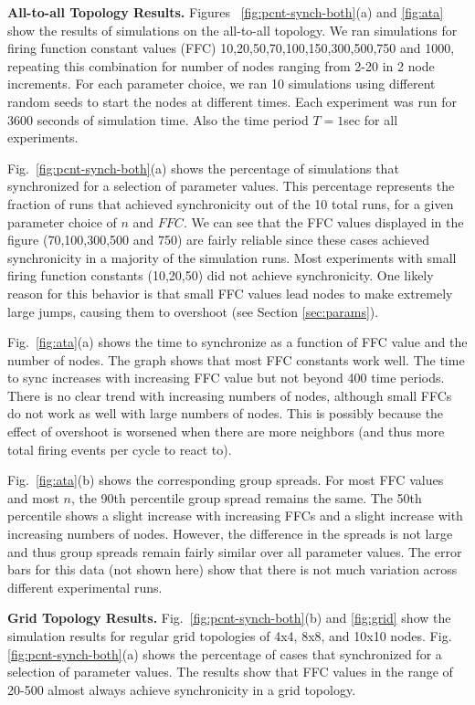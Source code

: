 {\bf All-to-all Topology Results.}  Figures
~\ref{fig:pcnt-synch-both}(a) and \ref{fig:ata} show the results of
simulations on the all-to-all topology. We ran simulations for firing
function constant values (FFC) 10,20,50,70,100,150,300,500,750 and
1000, repeating this combination for number of nodes ranging from 2-20
in 2 node increments. For each parameter choice, we ran 10 simulations
using different random seeds to start the nodes at different
times. Each experiment was run for 3600 seconds of simulation
time. Also the time period $T=1$sec for all experiments.

Fig.~\ref{fig:pcnt-synch-both}(a) shows the percentage of simulations
that synchronized for a selection of parameter values. This percentage
represents the fraction of runs that achieved synchronicity out of the
10 total runs, for a given parameter choice of $n$ and $FFC$.  We can
see that the FFC values displayed in the figure (70,100,300,500 and
750) are fairly reliable since these cases achieved synchronicity in a
majority of the simulation runs.  Most experiments with small firing
function constants (10,20,50) did not achieve synchronicity. One
likely reason for this behavior is that small FFC values lead nodes to
make extremely large jumps, causing them to overshoot (see Section
\ref{sec:params}).

Fig.~\ref{fig:ata}(a) shows the time to synchronize as a function of
FFC value and the number of nodes. The graph shows that most FFC
constants work well. The time to sync increases with increasing FFC
value but not beyond 400 time periods. There is no clear trend with
increasing numbers of nodes, although small FFCs do not work as well
with large numbers of nodes. This is possibly because the effect of
overshoot is worsened when there are more neighbors (and thus more
total firing events per cycle to react to).

Fig.~\ref{fig:ata}(b) shows the corresponding group spreads. For most
FFC values and most $n$, the 90th percentile group spread remains the
same. The 50th percentile shows a slight increase with increasing FFCs
and a slight increase with increasing numbers of nodes. However, the
difference in the spreads is not large and thus group spreads remain
fairly similar over all parameter values. The error bars for this data
(not shown here) show that there is not much variation across
different experimental runs.

{\bf Grid Topology Results.}  Fig.~\ref{fig:pcnt-synch-both}(b) and
\ref{fig:grid} show the simulation results for regular grid topologies
of 4x4, 8x8, and 10x10 nodes. Fig. \ref{fig:pcnt-synch-both}(a) shows
the percentage of cases that synchronized for a selection of parameter
values. The results show that FFC values in the range of 20-500 almost
always achieve synchronicity in a grid topology.

